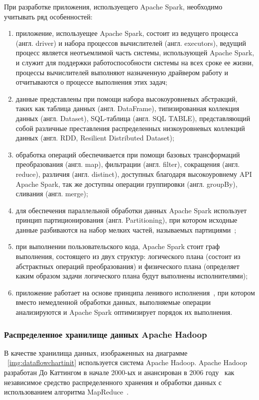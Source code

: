 При разработке приложения, используещего Apache Spark, необходимо учитывать ряд особенностей:
\begin{enumerate}
    \item приложение, используещее Apache Spark, состоит из ведущего процесса (англ. driver) и набора процессов 
    вычислителей (англ. executors), ведущий процесс является неотъемлимой часть системы, использующей Apache Spark,
    и служит для поддержки работоспособности системы на всех сроке ее жизни, процессы вычислителей выполняют
    назначенную драйвером работу и отчитываются о процессе выполнения этих задач;
    \item данные представлены при помощи набора высокоуровневых абстракций, таких как таблица данных (англ. DataFrame),
    типизированная коллекция данных (англ. Dataset), SQL-таблица (англ. SQL TABLE),  представляющий собой различные
    преставления распределенных низкоуровневых коллекций данных (англ. RDD, Resilient Distributed Dataset);
    \item обработка операций обеспечивается при помощи базовых трансформаций преобразования (англ. map), фильтрации (англ. filter), 
    сокращения (англ. reduce), различия (англ. distinct), доступных благодаря высокоуровнему API Apache Spark, так же доступны
    операции группировки (англ. groupBy), сливания (англ. merge);
    \item для обеспечения параллельной обработки данных Apache Spark использует принцип партиционирования (англ. Partitioning),
    при котором исходные данные разбиваются на набор мелких частей, называемых партициями~\autocite{impl:partioning};
    \item при выполнении пользовательского кода, Apache Spark стоит граф выполнения, состоящего из двух структур: логического 
    плана (состоит из абстрактных операций преобразования) и физического плана (определяет каким образом задачи логического 
    плана будут выполнены исполнителями);
    \item приложение работает на основе принципа ленивого исполнения~\autocite{impl:spark-guide}, при котором вместо немедленной обработки данных,
    выполняемые операции анализируются и Apache Spark оптимизирует порядок их выполнения. 
\end{enumerate}

\subsubsection{Распределенное хранилище данных Apache Hadoop}
В качестве хранилища данных, изображенных на диаграмме ~\ref{img:dataflowchartinit} используется система
Apache Hadoop. Apache Hadoop разработан До Каттингом в начале 2000-ых и анансирован в 2006 году~\autocite{impl:hadoop}
как независимое средство распределенного хранения и обработки данных с использованием алгоритма MapReduce~\autocite{impl:mapreduce}.

